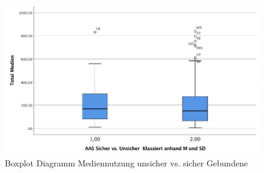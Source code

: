 \begin{figure}[h]
  \centering
     \includegraphics[scale=0.4]{content/Grafik/Boxplot_TotalMedien_SicherUnsicherGebunden.jpg}
  \captionsetup{margin=80pt}
  \caption{Boxplot Diagramm Mediennutzung unsicher vs. sicher Gebundene}
  \label{fig:AppBoxplotDiagrammSicherUnsicherGebunden}
\end{figure}